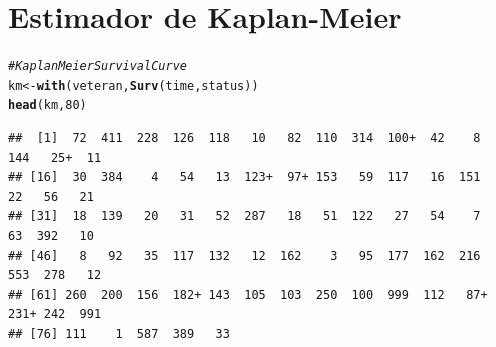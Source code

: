 \documentclass[a4paper, oneside]{book}\usepackage[]{graphicx}\usepackage[]{color}
\makeatletter
\newcommand{\hlnum}[1]{\textcolor[rgb]{0.686,0.059,0.569}{#1}}%
\newcommand{\hlcom}[1]{\textcolor[rgb]{0.678,0.584,0.686}{\textit{#1}}}%
\newcommand{\hlstd}[1]{\textcolor[rgb]{0.345,0.345,0.345}{#1}}%
\newcommand{\hlkwb}[1]{\textcolor[rgb]{0.69,0.353,0.396}{#1}}%
\newcommand{\hlkwd}[1]{\textcolor[rgb]{0.737,0.353,0.396}{\textbf{#1}}}%
\newenvironment{kframe}{%
 \def\at@end@of@kframe{}%
 \ifinner\ifhmode%
  \def\at@end@of@kframe{\end{minipage}}%
  \begin{minipage}{\columnwidth}%
 \fi\fi%
 \def\FrameCommand##1{\hskip\@totalleftmargin \hskip-\fboxsep
 \colorbox{shadecolor}{##1}\hskip-\fboxsep
     \hskip-\linewidth \hskip-\@totalleftmargin \hskip\columnwidth}%
 \MakeFramed {\advance\hsize-\width
   \@totalleftmargin\z@ \linewidth\hsize
   \@setminipage}}%
 {\par\unskip\endMakeFramed%
 \at@end@of@kframe}
\newenvironment{knitrout}{}{} %
\makeatother
\begin{document}
    \section{Estimador de Kaplan-Meier}
    
\begin{knitrout}
\color{fgcolor}\begin{kframe}
\begin{alltt}
\hlcom{# Kaplan Meier Survival Curve}
\hlstd{km} \hlkwb{<-} \hlkwd{with}\hlstd{(veteran,} \hlkwd{Surv}\hlstd{(time, status))}
\hlkwd{head}\hlstd{(km,}\hlnum{80}\hlstd{)}
\end{alltt}
\begin{verbatim}
##  [1]  72  411  228  126  118   10   82  110  314  100+  42    8  144   25+  11 
## [16]  30  384    4   54   13  123+  97+ 153   59  117   16  151   22   56   21 
## [31]  18  139   20   31   52  287   18   51  122   27   54    7   63  392   10 
## [46]   8   92   35  117  132   12  162    3   95  177  162  216  553  278   12 
## [61] 260  200  156  182+ 143  105  103  250  100  999  112   87+ 231+ 242  991 
## [76] 111    1  587  389   33
\end{verbatim}
\end{kframe}
\end{knitrout}
\end{document}
